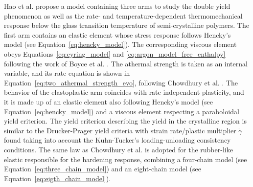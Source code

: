 Hao et al. \citep{haoRatedependentConstitutiveModel2022} propose a model containing three arms to study the double yield phenomenon as well as the rate- and temperature-dependent thermomechanical response below the glass transition temperature of semi-crystalline polymers.
The first arm contains an elastic element whose stress response follows Hencky's model (see Equation~\eqref{eq:hencky_model}).
The corresponding viscous element obeys Equations~\eqref{eq:eyring_model} and \eqref{eq:argon_model_free_enthalpy} following the work of Boyce et al. \citep{boyceLargeInelasticDeformation1988}.
The athermal strength is taken as an internal variable, and its rate equation is shown in Equation~\eqref{eq:two_athermal_strength_evo}, following Chowdhury et al. \citep{chowdhuryEffectsManufacturingInducedVoids2008}.
The behavior of the elastoplastic arm coincides with rate-independent plasticity, and it is made up of an elastic element also following Hencky's model (see Equation~\eqref{eq:hencky_model}) and a viscous element respecting a paraboloidal yield criterion.
The yield criterion describing the yield in the crystalline region is similar to the Drucker-Prager yield criteria with strain rate/plastic multiplier $\dot \gamma$ found taking into account the Kuhn-Tucker's loading-unloading consistency conditions.
The same law as Chowdhury et al. is adopted for the rubber-like elastic responsible for the hardening response, combining a  four-chain model (see Equation~\eqref{eq:three_chain_model}) and an eight-chain model (see Equation~\eqref{eq:eigth_chain_model}).

